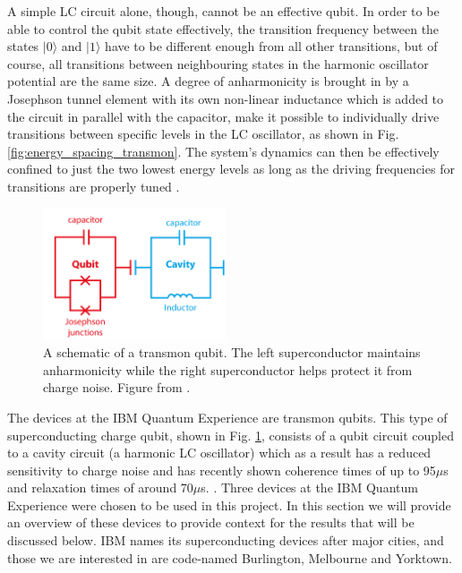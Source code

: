 A simple LC circuit alone, though, cannot be an effective qubit. In order to be
able to control the qubit state effectively, the transition frequency between
the states $|0\rangle$ and $|1\rangle$ have to be different enough from all
other transitions, but of course, all transitions between neighbouring states in
the harmonic oscillator potential are the same size. A degree of anharmonicity
is brought in by a Josephson tunnel element with its own non-linear inductance
which is added to the circuit in parallel with the capacitor, make it possible
to individually drive transitions between specific levels in the LC oscillator,
as shown in Fig. \ref{fig:energy_spacing_transmon}. The system's dynamics can
then be effectively confined to just the two lowest energy levels as long as the
driving frequencies for transitions are properly tuned
\cite{devoret04_implem_qubit_with_super_integ_circuit}.

\begin{figure}[h]
  \centering \includegraphics[width=0.48\textwidth]{images/transmon_diagram.png}
  \caption{A schematic of a transmon qubit. The left superconductor maintains
    anharmonicity while the right superconductor helps protect it from charge
    noise. Figure from \cite{dickel20_how_to_make_artif_atoms}.}
  \label{fig:transmon}
\end{figure}

The devices at the IBM Quantum Experience are transmon qubits. This type of
superconducting charge qubit, shown in Fig. \ref{fig:transmon}, consists of a qubit
circuit coupled to a cavity circuit (a harmonic LC oscillator) which as a result
has a reduced sensitivity to
charge noise and has recently shown coherence times of up to 95$\mu$s and
relaxation times of around 70$\mu$s.
\cite{rigetti12_super_qubit_waveg_cavit_with}. Three devices at the IBM Quantum
Experience were chosen to be used in this project. In this section we will
provide an overview of these devices to provide context for the results that
will be discussed below. IBM names its superconducting devices after major
cities, and those we are interested in are code-named Burlington, Melbourne and
Yorktown.

